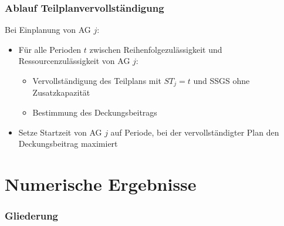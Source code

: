 \begin{frame}
\frametitle{Ablauf Teilplanvervollständigung}
Bei Einplanung von AG $j$:
\vspace*{2mm}
\begin{itemize}
\item Für alle Perioden $t$ zwischen Reihenfolgezulässigkeit und Ressourcenzulässigkeit von AG $j$:
\begin{itemize}
\item Vervollständigung des Teilplans mit $ST_j=t$ und SSGS ohne Zusatzkapazität
\item Bestimmung des Deckungsbeitrags\\[3mm]
\end{itemize}
\item Setze Startzeit von AG $j$ auf Periode, bei der vervollständigter Plan den Deckungsbeitrag maximiert
\end{itemize}
\end{frame}



\section{Numerische Ergebnisse}
\begin{frame}
\frametitle{Gliederung}
\tableofcontents[current] %
\end{frame}


